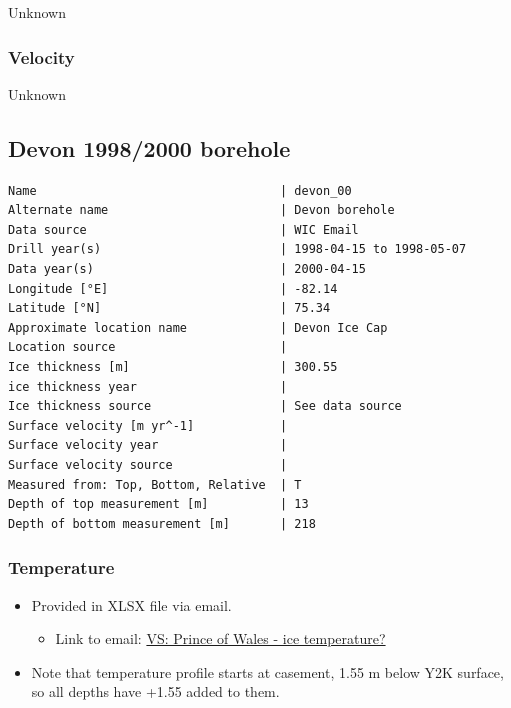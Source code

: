 \documentclass[article,a4paper,times,11pt,twoside]{article}
\begin{document}
Unknown

\subsubsection{Velocity}
\label{sec:org491c6e0}

Unknown
\clearpage
\subsection{Devon 1998/2000 borehole}
\label{sec:org1b641fa}
\begin{verbatim}
Name                                  | devon_00
Alternate name                        | Devon borehole
Data source                           | WIC Email
Drill year(s)                         | 1998-04-15 to 1998-05-07
Data year(s)                          | 2000-04-15
Longitude [°E]                        | -82.14
Latitude [°N]                         | 75.34
Approximate location name             | Devon Ice Cap
Location source                       | 
Ice thickness [m]                     | 300.55
ice thickness year                    | 
Ice thickness source                  | See data source
Surface velocity [m yr^-1]            | 
Surface velocity year                 | 
Surface velocity source               | 
Measured from: Top, Bottom, Relative  | T
Depth of top measurement [m]          | 13
Depth of bottom measurement [m]       | 218
\end{verbatim}

\subsubsection{Temperature}
\label{sec:org1b63cbd}

\begin{itemize}
\item Provided in XLSX file via email.
\begin{itemize}
\item Link to email: \href{msgid:AM0PR04MB61295B7BB1FF4BE1112B94ABA2F30@AM0PR04MB6129.eurprd04.prod.outlook.com}{VS: Prince of Wales - ice temperature?}
\end{itemize}
\item Note that temperature profile starts at casement, 1.55 m below Y2K surface, so all depths have +1.55 added to them.
\end{itemize}
\end{document}
